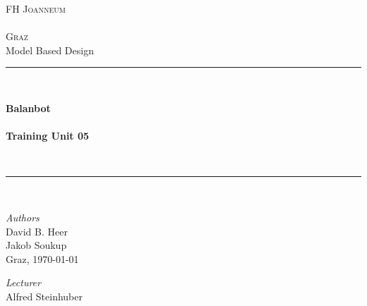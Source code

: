 \thispagestyle{empty}


\begin{titlepage}

	\begin{center}
	
	\textsc{
		\LARGE FH Joanneum\\~\\Graz}\\[1.5cm]
	\vfill{}
	\large Model Based Design
	\\[0.5cm]
	\newcommand{\HRule}{\rule{\linewidth}{0.5mm}}
	\HRule
	\\[0.4cm]
	{

		\Huge \bfseries Balanbot\\
						
	        ~\\
	        \large  Training Unit 05  }
	\\[0.4cm]
	\HRule
	\\[0.5cm]
	
	
	\vfill{}
	
	\begin{minipage}{0.4\textwidth}
	    \begin{flushleft} \large
		\emph{Authors}\\
	        David B. Heer\\ 
	        Jakob  Soukup\\
		Graz, \today
	    \end{flushleft}
	\end{minipage}
	\hfill
	\begin{minipage}{0.4\textwidth}
	    \begin{flushright} \large
	        \emph{Lecturer} \\
	        Alfred Steinhuber \\ ~ \\
	    \end{flushright}
	\end{minipage}
	
	\end{center}

\end{titlepage}
